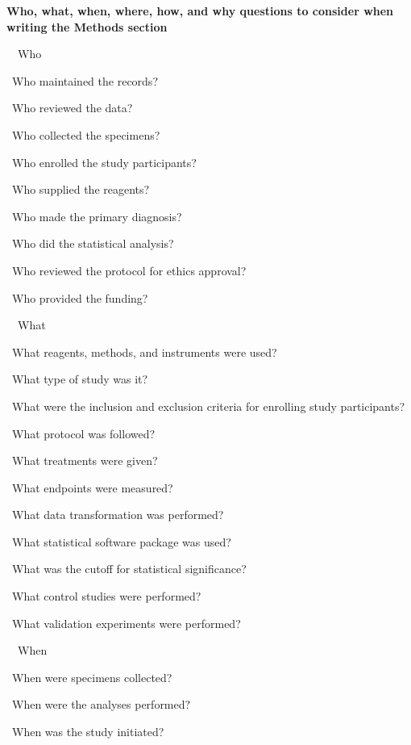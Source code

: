 \documentclass[a4paper, 12pt]{article}
\begin{document}
\newpage\textbf{Who, what, when, where, how, and why questions to consider when writing the Methods section}
\par\ \textbullet\ Who
\par\quad\textopenbullet\ Who maintained the records?
\par\quad\textopenbullet\ Who reviewed the data?
\par\quad\textopenbullet\ Who collected the specimens?
\par\quad\textopenbullet\ Who enrolled the study participants?
\par\quad\textopenbullet\ Who supplied the reagents?
\par\quad\textopenbullet\ Who made the primary diagnosis?
\par\quad\textopenbullet\ Who did the statistical analysis?
\par\quad\textopenbullet\ Who reviewed the protocol for ethics approval?
\par\quad\textopenbullet\ Who provided the funding?
\par\ \textbullet\ What
\par\quad\textopenbullet\ What reagents, methods, and instruments were used?
\par\quad\textopenbullet\ What type of study was it?
\par\quad\textopenbullet\ What were the inclusion and exclusion criteria for enrolling study participants?
\par\quad\textopenbullet\ What protocol was followed?
\par\quad\textopenbullet\ What treatments were given?
\par\quad\textopenbullet\ What endpoints were measured?
\par\quad\textopenbullet\ What data transformation was performed?
\par\quad\textopenbullet\ What statistical software package was used?
\par\quad\textopenbullet\ What was the cutoff for statistical significance?
\par\quad\textopenbullet\ What control studies were performed?
\par\quad\textopenbullet\ What validation experiments were performed?
\newpage\par\ \textbullet\ When
\par\quad\textopenbullet\ When were specimens collected?
\par\quad\textopenbullet\ When were the analyses performed?
\par\quad\textopenbullet\ When was the study initiated?
\end{document}
